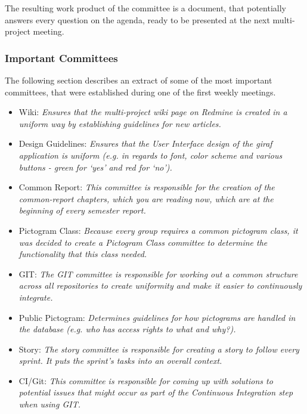 The resulting work product of the committee is a document, that potentially answers every question on the agenda, ready to be presented at the next multi-project meeting.

\subsubsection*{Important Committees}
\label{subsub:importantcommittees}
The following section describes an extract of some of the most important committees, that were established during one of the first weekly meetings.

\begin{itemize}
        \item Wiki: \emph{Ensures that the multi-project wiki page on Redmine is created in a uniform way by establishing guidelines for new
        articles.}
        \item Design Guidelines: \emph{Ensures that the User Interface design of the \ac{giraf} application is uniform (e.g. in regards to font, color scheme and various buttons - green for `yes' and red for `no').}
        \item Common Report: \emph{This committee is responsible for the creation of the common-report chapters, which you are reading now, which are at the beginning of every semester report.}
        \item Pictogram Class: \emph{Because every group requires a common pictogram class, it was decided to create a Pictogram Class committee to determine the functionality that this class needed.}
        \item GIT: \emph{The GIT committee is responsible for working out a common structure across all repositories to create uniformity and make it easier to continuously integrate.}
        \item Public Pictogram: \emph{Determines guidelines for how pictograms are handled in the database (e.g. who has access rights to what and why?).}
        \item Story: \emph{The story committee is responsible for creating a story to follow every sprint. It puts the sprint's tasks into an overall context.}
        \item CI/Git: \emph{This committee is responsible for coming up with solutions to potential issues that might occur as part of the Continuous Integration step when using GIT.}
\end{itemize}
